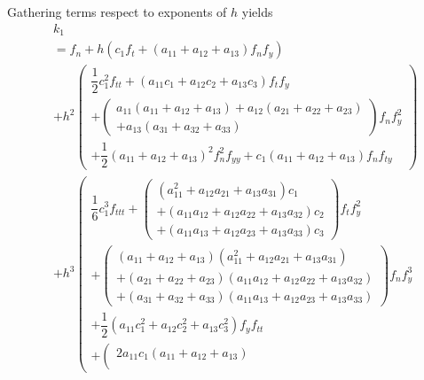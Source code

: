 \documentclass[a4paper,oneside]{book}
\numberwithin{equation}{chapter}
\begin{document}
Gathering terms respect to exponents of $h$ yields
\begin{align}
&{k_1} \\
&= {f_n} + h\left( {{c_1}{f_t} + \left( {{a_{11}} + {a_{12}} + {a_{13}}} \right){f_n}{f_y}} \right)\\
& + {h^2}\left( \begin{array}{l}
\dfrac{1}{2}c_1^2{f_{tt}} + \left( {{a_{11}}{c_1} + {a_{12}}{c_2} + {a_{13}}{c_3}} \right){f_t}{f_y}\\
 + \left( \begin{array}{l}
{a_{11}}\left( {{a_{11}} + {a_{12}} + {a_{13}}} \right) + {a_{12}}\left( {{a_{21}} + {a_{22}} + {a_{23}}} \right)\\
 + {a_{13}}\left( {{a_{31}} + {a_{32}} + {a_{33}}} \right)
\end{array} \right){f_n}f_y^2\\
 + \dfrac{1}{2}{\left( {{a_{11}} + {a_{12}} + {a_{13}}} \right)^2}f_n^2{f_{yy}} + {c_1}\left( {{a_{11}} + {a_{12}} + {a_{13}}} \right){f_n}{f_{ty}}
\end{array} \right)\\
 &+ {h^3}\left( \begin{array}{l}
\dfrac{1}{6}c_1^3{f_{ttt}} + \left( \begin{array}{l}
\left( {a_{11}^2 + {a_{12}}{a_{21}} + {a_{13}}{a_{31}}} \right){c_1}\\
 + \left( {{a_{11}}{a_{12}} + {a_{12}}{a_{22}} + {a_{13}}{a_{32}}} \right){c_2}\\
 + \left( {{a_{11}}{a_{13}} + {a_{12}}{a_{23}} + {a_{13}}{a_{33}}} \right){c_3}
\end{array} \right){f_t}f_y^2\\
 + \left( \begin{array}{l}
\left( {{a_{11}} + {a_{12}} + {a_{13}}} \right)\left( {a_{11}^2 + {a_{12}}{a_{21}} + {a_{13}}{a_{31}}} \right)\\
 + \left( {{a_{21}} + {a_{22}} + {a_{23}}} \right)\left( {{a_{11}}{a_{12}} + {a_{12}}{a_{22}} + {a_{13}}{a_{32}}} \right)\\
 + \left( {{a_{31}} + {a_{32}} + {a_{33}}} \right)\left( {{a_{11}}{a_{13}} + {a_{12}}{a_{23}} + {a_{13}}{a_{33}}} \right)
\end{array} \right){f_n}f_y^3\\
 + \dfrac{1}{2}\left( {{a_{11}}c_1^2 + {a_{12}}c_2^2 + {a_{13}}c_3^2} \right){f_y}{f_{tt}}\\
 + \left( \begin{array}{l}
2{a_{11}}{c_1}\left( {{a_{11}} + {a_{12}} + {a_{13}}} \right)\\

\end{array}
\end{array}
\end{align}
\end{document}
